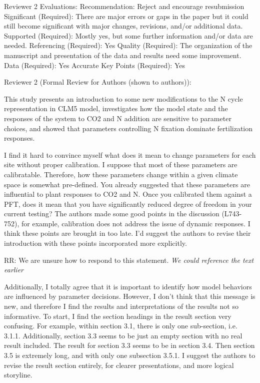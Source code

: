 \documentclass{article}
\begin{document}
Reviewer 2 Evaluations: 
Recommendation: Reject and encourage resubmission 
Significant (Required): There are major errors or gaps in the paper but it could still become significant with major changes, revisions, and/or additional data. 
Supported (Required): Mostly yes, but some further information and/or data are needed. 
Referencing (Required): Yes 
Quality (Required): The organization of the manuscript and presentation of the data and results need some improvement. 
Data (Required): Yes 
Accurate Key Points (Required): Yes 

Reviewer 2 (Formal Review for Authors (shown to authors)): 

This study presents an introduction to some new modifications to the N cycle representation in CLM5 model, investigates how the model state and the responses of the system to CO2 and N addition are sensitive to parameter choices, and showed that parameters controlling N fixation dominate fertilization responses. 

I find it hard to convince myself what does it mean to change parameters for each site without proper calibration. I suppose that most of these parameters are calibratable. Therefore, how these parameters change within a given climate space is somewhat pre-defined. You already suggested that these parameters are influential to plant responses to CO2 and N. Once you calibrated them against a PFT, does it mean that you have significantly reduced degree of freedom in your current testing? The authors made some good points in the discussion (L743-752), for example, calibration does not address the issue of dynamic responses. I think these points are brought in too late. I'd suggest the authors to revise their introduction with these points incorporated more explicitly.

RR: We are unsure how to respond to this statement. \emph{We could reference the text earlier}

Additionally, I totally agree that it is important to identify how model behaviors are influenced by parameter decisions. However, I don't think that this message is new, and therefore I find the results and interpretations of the results not so informative. To start, I find the section headings in the result section very confusing. For example, within section 3.1, there is only one sub-section, i.e. 3.1.1. Additionally, section 3.3 seems to be just an empty section with no real result included. The result for section 3.3 seems to be in section 3.4. Then section 3.5 is extremely long, and with only one subsection 3.5.1. I suggest the authors to revise the result section entirely, for clearer presentations, and more logical storyline. 
\end{document}
